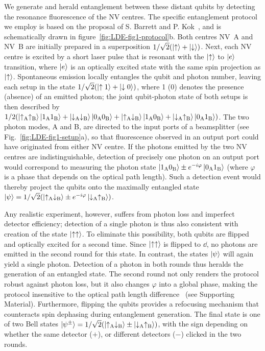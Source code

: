 We generate and herald entanglement between these distant qubits by detecting the resonance fluorescence of the NV centres. The specific entanglement protocol we employ is based on the proposal of S. Barrett and P. Kok~\cite{Barrett2005}, and is schematically drawn in figure~\ref{fig:LDE-fig1-protocol}b. Both centres NV~A and NV~B are initially prepared in a superposition $1/\sqrt{2}(\left|\uparrow\right\rangle+\left|\downarrow\right\rangle)$. Next, each NV centre is excited by a short laser pulse that is resonant with the $\left|\uparrow\right\rangle$ to $\left|e\right\rangle$ transition, where $\left|e\right\rangle$ is an optically excited state with the same spin projection as $\left|\uparrow\right\rangle$. Spontaneous emission locally entangles the qubit and photon number, leaving each setup in the state $1/\sqrt{2}(\left|\uparrow 1\right\rangle+\left|\downarrow 0\right\rangle)$, where 1 (0) denotes the presence (absence) of an emitted photon; the joint qubit-photon state of both setups is then described by $1/2(\left|\uparrow_\text{A}\uparrow_\text{B}\right\rangle\left|1_\text{A}1_\text{B}\right\rangle+\left|\downarrow_\text{A}\downarrow_\text{B}\right\rangle\left|0_\text{A}0_\text{B}\right\rangle+\left|\uparrow_\text{A}\downarrow_\text{B}\right\rangle\left|1_\text{A}0_\text{B}\right\rangle+\left|\downarrow_\text{A}\uparrow_\text{B}\right\rangle\left|0_\text{A}1_\text{B}\right\rangle)$. The two photon modes, A and B, are directed to the input ports of a beamsplitter (see Fig.~\ref{fig:LDE-fig1-setup}a), so that fluorescence observed in an output port could have originated from either NV centre. If the photons emitted by the two NV centres are indistinguishable, detection of precisely one photon on an output port would correspond to measuring the photon state $\left|1_\text{A}0_\text{B}\right\rangle\pm e^{-i\varphi}\left|0_\text{A}1_\text{B}\right\rangle$ (where $\varphi$ is a phase that depends on the optical path length). Such a detection event would thereby project the qubits onto the maximally entangled state $\left|\psi\right\rangle=1/\sqrt{2}(\left|\uparrow_\text{A}\downarrow_\text{B}\right\rangle\pm e^{-i\varphi}\left|\downarrow_\text{A}\uparrow_\text{B}\right\rangle)$.

Any realistic experiment, however, suffers from photon loss and imperfect detector efficiency; detection of a single photon is thus also consistent with creation of the state $\left|\uparrow\uparrow\right\rangle$. To eliminate this possibility, both qubits are flipped and optically excited for a second time. Since $\left|\uparrow\uparrow\right\rangle$ is flipped to $\dd$, no photons are emitted in the second round for this state. In contrast, the states $\left|\psi\right\rangle$ will again yield a single photon. Detection of a photon in both rounds thus heralds the generation of an entangled state. The second round not only renders the protocol robust against photon loss, but it also changes $\varphi$ into a global phase, making the protocol insensitive to the optical path length difference~\cite{Barrett2005} (see Supporting Material). Furthermore, flipping the qubits provides a refocusing mechanism that counteracts spin dephasing during entanglement generation. The final state is one of two Bell states $\left|\psi^\pm\right\rangle=1/\sqrt{2}(\left|\uparrow_\text{A}\downarrow_\text{B}\right\rangle\pm\left|\downarrow_\text{A}\uparrow_\text{B}\right\rangle)$, with the sign depending on whether the same detector ($+$), or different detectors ($-$) clicked in the two rounds.


